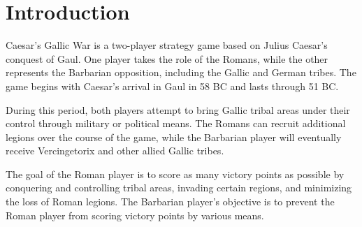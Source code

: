 \section{Introduction}
\par
Caesar's Gallic War is a two-player strategy game based on Julius Caesar's conquest of Gaul. One player takes the role of the Romans, while the other represents the Barbarian opposition, including the Gallic and German tribes. The game begins with Caesar's arrival in Gaul in 58 BC and lasts through 51 BC.
\par
During this period, both players attempt to bring Gallic tribal areas under their control through military or political means. The Romans can recruit additional legions over the course of the game, while the Barbarian player will eventually receive Vercingetorix and other allied Gallic tribes.
\par
The goal of the Roman player is to score as many victory points as possible by conquering and controlling tribal areas, invading certain regions, and minimizing the loss of Roman legions. The Barbarian player's objective is to prevent the Roman player from scoring victory points by various means.
